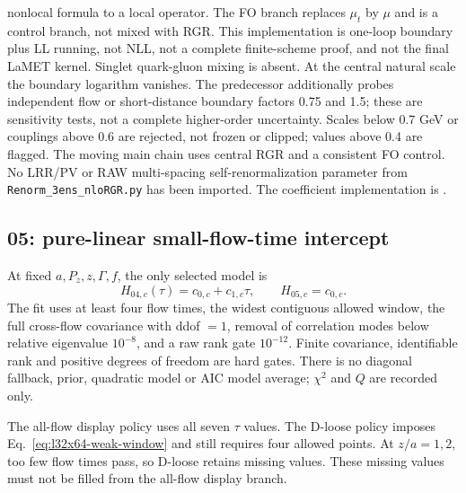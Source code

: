 \documentclass[11pt]{article}
\numberwithin{equation}{section}
\begin{document}
nonlocal formula to a local operator.  The FO branch replaces \(\mu_t\) by
\(\mu\) and is a control branch, not mixed with RGR.  This implementation
is one-loop boundary plus LL running, not NLL, not a complete finite-scheme
proof, and not the final LaMET kernel.  Singlet quark-gluon mixing is absent.
At the central natural scale the boundary logarithm vanishes.  The
predecessor additionally probes independent flow or short-distance
boundary factors 0.75 and 1.5; these are sensitivity tests, not a
complete higher-order uncertainty.  Scales below 0.7 GeV or couplings
above 0.6 are rejected, not frozen or clipped; values above 0.4 are
flagged.  The moving main chain uses central RGR and a consistent FO
control.  No LRR/PV or RAW multi-spacing self-renormalization parameter
from \texttt{Renorm\_3ens\_nloRGR.py} has been imported.
The coefficient implementation is
.

\subsection{05: pure-linear small-flow-time intercept}

At fixed \(a,P_z,z,\Gamma,f\), the only selected model is
\begin{equation}
 H_{04,c}(\tau)=c_{0,c}+c_{1,c}\tau,\qquad H_{05,c}=c_{0,c}.
\label{eq:l32x64-linear-flow}
\end{equation}
The fit uses at least four flow times, the widest contiguous allowed window,
the full cross-flow covariance with ddof \(=1\), removal of correlation modes
below relative eigenvalue \(10^{-8}\), and a raw rank gate \(10^{-12}\).
Finite covariance, identifiable rank and positive degrees of freedom are
hard gates.  There is no diagonal fallback, prior, quadratic model or AIC
model average; \(\chi^2\) and \(Q\) are recorded only.

The all-flow display policy uses all seven \(\tau\) values.  The D-loose
policy imposes Eq.~\eqref{eq:l32x64-weak-window} and still requires four
allowed points.  At \(z/a=1,2\), too few flow times pass, so D-loose
retains missing values.  These missing values must not be filled from the
all-flow display branch.
\end{document}
